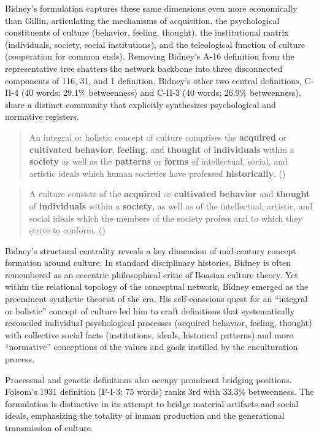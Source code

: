 \documentclass[11pt]{article}
\begin{document}
Bidney's formulation captures these same dimensions even more economically than Gillin, articulating the mechanisms of acquisition, the psychological constituents of culture (behavior, feeling, thought), the institutional matrix (individuals, society, social institutions), and the teleological function of culture (cooperation for common ends). Removing Bidney's A-16 definition from the representative tree shatters the network backbone into three disconnected components of 116, 31, and 1 definition. Bidney's other two central definitions, C-II-4 (40 words; 29.1\% betweenness) and C-II-3 (40 words; 26.9\% betweenness), share a distinct community that explicitly synthesizes psychological and normative registers.

\begin{quotation}
An integral or holistic concept of culture comprises the \textbf{acquired} or \textbf{cultivated} \textbf{behavior}, \textbf{feeling}, and \textbf{thought} of \textbf{individuals} within a \textbf{society} as well as the \textbf{patterns} or \textbf{forms} of intellectual, social, and artistic ideals which human societies have professed \textbf{historically}. (\citealt{bidney1946})
\end{quotation}

\begin{quotation}
A culture consists of the \textbf{acquired} or \textbf{cultivated} \textbf{behavior} and \textbf{thought} of \textbf{individuals} within a \textbf{society}, as well as of the intellectual, artistic, and social ideals which the members of the society profess and to which they strive to conform. (\citealt{bidney1942})
\end{quotation}

Bidney's structural centrality reveals a key dimension of mid-century concept formation around culture. In standard disciplinary histories, Bidney is often remembered as an eccentric philosophical critic of Boasian culture theory. Yet within the relational topology of the conceptual network, Bidney emerged as the preeminent synthetic theorist of the era. His self-conscious quest for an ``integral or holistic'' concept of culture led him to craft definitions that systematically reconciled individual psychological processes (acquired behavior, feeling, thought) with collective social facts (institutions, ideals, historical patterns) and more ``normative'' conceptions of the values and goals instilled by the enculturation process.

Processual and genetic definitions also occupy prominent bridging positions. Folsom's 1931 definition (F-I-3; 75 words) ranks 3rd with 33.3\% betweenness. The formulation is distinctive in its attempt to bridge material artifacts and social ideals, emphasizing the totality of human production and the generational transmission of culture.
\end{document}
